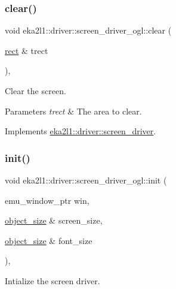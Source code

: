 \subsubsection{\texorpdfstring{clear()}{clear()}}
{\footnotesize\ttfamily void eka2l1\+::driver\+::screen\+\_\+driver\+\_\+ogl\+::clear (\begin{DoxyParamCaption}\item[{\mbox{\hyperlink{structeka2l1_1_1rect}{rect}} \&}]{trect }\end{DoxyParamCaption})\hspace{0.3cm}{\ttfamily [override]}, {\ttfamily [virtual]}}



Clear the screen. 


\begin{DoxyParams}{Parameters}
{\em trect} & The area to clear. \\
\hline
\end{DoxyParams}


Implements \mbox{\hyperlink{classeka2l1_1_1driver_1_1screen__driver_a9b963b43dc70b16781121238f713acb3}{eka2l1\+::driver\+::screen\+\_\+driver}}.

\mbox{\label{classeka2l1_1_1driver_1_1screen__driver__ogl_a51a7f69eb40e7ca2272c627061e010ba}} 
\subsubsection{\texorpdfstring{init()}{init()}}
{\footnotesize\ttfamily void eka2l1\+::driver\+::screen\+\_\+driver\+\_\+ogl\+::init (\begin{DoxyParamCaption}\item[{emu\+\_\+window\+\_\+ptr}]{win,  }\item[{\mbox{\hyperlink{structeka2l1_1_1object__size}{object\+\_\+size}} \&}]{screen\+\_\+size,  }\item[{\mbox{\hyperlink{structeka2l1_1_1object__size}{object\+\_\+size}} \&}]{font\+\_\+size }\end{DoxyParamCaption})\hspace{0.3cm}{\ttfamily [override]}, {\ttfamily [virtual]}}



Intialize the screen driver. 



